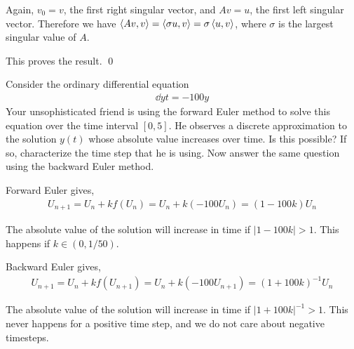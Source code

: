 \documentclass[10pt]{article}
\begin{document}
\begin{solution}[Solution]
\begin{enumerate}[label=(\alph*)]
        Again, \( v_0 = v \), the first right singular vector, and \( Av = u \), the first left singular vector. Therefore we have \( \left\langle Av,v \right\rangle = \left\langle \sigma u, v \right\rangle = \sigma\left\langle u,v \right\rangle \), where \( \sigma \) is the largest singular value of \( A \). 
        
        This proves the result. \qed 


\end{enumerate}

\end{solution}


\begin{problem}
Consider the ordinary differential equation
\begin{align*}
    \dd{y}{t} = -100 y
\end{align*}
    Your unsophisticated friend is using the forward Euler method to solve this equation over the time interval \( [0, 5] \). He observes a discrete approximation to the solution \( y(t) \) whose absolute value increases over time. Is this possible? If so, characterize the time step that he is using. Now answer the same question using the backward Euler method.
\end{problem}

\begin{solution}[Solution]
Forward Euler gives,
\begin{align*}
    U_{n+1} = U_n + k f(U_n) = U_n + k (-100 U_n) = (1-100k)U_n
\end{align*}

The absolute value of the solution will increase in time if \( |1-100k| > 1 \). This happens if \( k\in(0,1/50) \).


Backward Euler gives,
\begin{align*}
    U_{n+1} = U_n + k f(U_{n+1}) = U_n + k(-100 U_{n+1}) = (1+100k)^{-1} U_n
\end{align*}

    The absolute value of the solution will increase in time if \( |1+100k|^{-1} > 1 \). This never happens for a positive time step, and we do not care about negative timesteps.
\end{solution}
\end{document}
